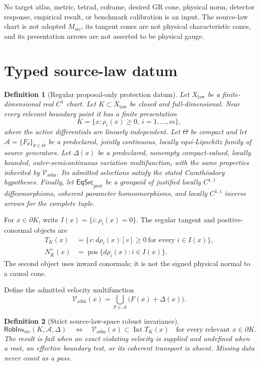 \documentclass[11pt]{article}
\newtheorem{definition}{Definition}
\newcommand{\RobInv}{\mathsf{RobInv}_{\mathrm{src}}}
\newcommand{\Vad}{\mathcal V_{\mathrm{adm}}}
\newcommand{\EqSrc}{\mathsf{EqSrc}_{\mathrm{prot}}}
\newcommand{\status}[1]{\textsf{#1}}
\begin{document}
No target atlas, metric, tetrad, coframe, desired GR cone, physical norm,
detector response, empirical result, or benchmark calibration is an input.
The source-law chart is not adopted \(M_{\mathrm{src}}\), its tangent cones
are not physical characteristic cones, and its presentation arrows are not
asserted to be physical gauge.

\section{Typed source-law datum}

\begin{definition}[Regular proposal-only protection datum]
Let \(X_{\mathrm{law}}\) be a finite-dimensional real \(C^1\) chart.  Let
\(K\subset X_{\mathrm{law}}\) be closed and full-dimensional.  Near every
relevant boundary point it has a finite presentation
\[
 K=\{x:\rho_i(x)\geq0,\ i=1,\ldots,m\},                 \tag{1}
\]
where the active differentials are linearly independent.  Let \(\Theta\) be
compact and let \(\mathcal A=\{F_\theta\}_{\theta\in\Theta}\) be a
predeclared, jointly continuous, locally equi-Lipschitz family of source
generators.  Let \(\Delta(x)\) be a predeclared, nonempty compact-valued,
locally bounded, outer-semicontinuous variation multifunction, with the same
properties inherited by \(\Vad\).  Its admitted selections satisfy the stated
Carathéodory hypotheses.  Finally, let \(\EqSrc\) be a groupoid of justified
locally \(C^{1,1}\) diffeomorphisms, coherent parameter homeomorphisms, and
locally \(C^{1,1}\) inverse arrows for the complete tuple.
\end{definition}

For \(x\in\partial K\), write
\(I(x)=\{i:\rho_i(x)=0\}\).  The regular tangent and positive-conormal
objects are
\begin{align}
 T_K(x)&=\{v:d\rho_i(x)[v]\geq0\ \text{for every }i\in I(x)\}, \tag{2}\\
 N_K^+(x)&=\operatorname{pos}\{d\rho_i(x):i\in I(x)\}.          \tag{3}
\end{align}
The second object uses inward conormals; it is not the signed physical normal
to a causal cone.

Define the admitted velocity multifunction
\[
 \Vad(x)=\bigcup_{F\in\mathcal A}\bigl(F(x)+\Delta(x)\bigr).
\]

\begin{definition}[Strict source-law-space robust invariance]
\begin{equation}
 \RobInv(K,\mathcal A,\Delta)
 \quad\Longleftrightarrow\quad
 \Vad(x)\subset\operatorname{Int}T_K(x)
 \quad\text{for every relevant }x\in\partial K .
 \label{eq:robinv}
\end{equation}
The result is \status{fail} when an exact violating velocity is supplied and
\status{undefined} when a root, an effective boundary test, or its coherent
transport is absent.  Missing data never count as a pass.
\end{definition}
\end{document}
